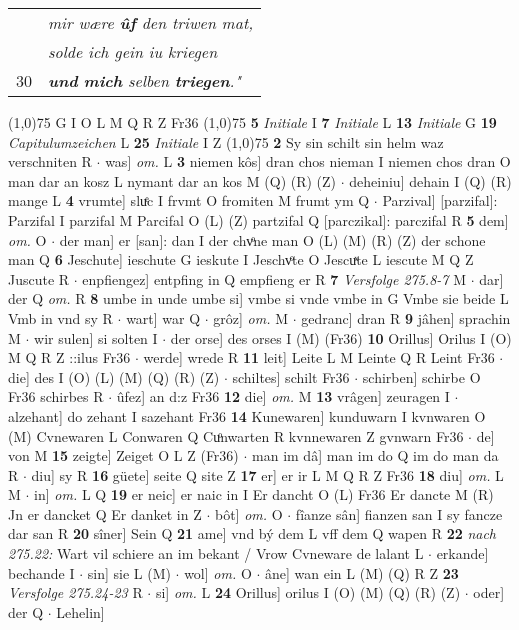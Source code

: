 \documentclass[8pt,a4paper,notitlepage]{article}
\begin{document}
\begin{table}[ht]
\begin{minipage}[t]{0.5\linewidth}
\begin{tabular}{rl}
 & \textit{mir wære \textbf{ûf} den triwen mat,}\\ 
 & \textit{solde ich gein iu kriegen}\\ 
30 & \textit{\textbf{und} \textbf{mich} selben \textbf{triegen}."}\\ 
\end{tabular}
\scriptsize
\line(1,0){75} \newline
G I O L M Q R Z Fr36 \newline
\line(1,0){75} \newline
\textbf{5} \textit{Initiale} I  \textbf{7} \textit{Initiale} L  \textbf{13} \textit{Initiale} G  \textbf{19} \textit{Capitulumzeichen} L  \textbf{25} \textit{Initiale} I Z  \newline
\line(1,0){75} \newline
\textbf{2} Sy sin schilt sin helm waz verschniten R  $\cdot$ was] \textit{om.} L \textbf{3} niemen kôs] dran chos nieman I niemen chos dran O man dar an kosz L nymant dar an kos M (Q) (R) (Z)  $\cdot$ deheiniu] dehain I (Q) (R) mange L \textbf{4} vrumte] sluͤc I frvmt O fromiten M frumt ym Q  $\cdot$ Parzival] [parzifal]: Parzifal I parzifal M Parcifal O (L) (Z) partzifal Q [parczikal]: parczifal R \textbf{5} dem] \textit{om.} O  $\cdot$ der man] er [san]: dan I der chvͦne man O (L) (M) (R) (Z) der schone man Q \textbf{6} Jeschute] ieschute G ieskute I Jeschvͦte O Jescuͯte L iescute M Q Z Juscute R  $\cdot$ enpfiengez] entpfing in Q empfieng er R \textbf{7} \textit{Versfolge 275.8-7} M   $\cdot$ dar] der Q \textit{om.} R \textbf{8} umbe in unde umbe si] vmbe si vnde vmbe in G Vmbe sie beide L Vmb in vnd sy R  $\cdot$ wart] war Q  $\cdot$ grôz] \textit{om.} M  $\cdot$ gedranc] dran R \textbf{9} jâhen] sprachin M  $\cdot$ wir sulen] si solten I  $\cdot$ der orse] des orses I (M) (Fr36) \textbf{10} Orillus] Orilus I (O) M Q R Z ::ilus Fr36  $\cdot$ werde] wrede R \textbf{11} leit] Leite L M Leinte Q R Leint Fr36  $\cdot$ die] des I (O) (L) (M) (Q) (R) (Z)  $\cdot$ schiltes] schilt Fr36  $\cdot$ schirben] schirbe O Fr36 schirbes R  $\cdot$ ûfez] an d:z Fr36 \textbf{12} die] \textit{om.} M \textbf{13} vrâgen] zeuragen I  $\cdot$ alzehant] do zehant I sazehant Fr36 \textbf{14} Kunewaren] kunduwarn I kvnwaren O (M) Cvnewaren L Conwaren Q Cuͦnwarten R kvnnewaren Z gvnwarn Fr36  $\cdot$ de] von M \textbf{15} zeigte] Zeiget O L Z (Fr36)  $\cdot$ man im dâ] man im do Q im do man da R  $\cdot$ diu] sy R \textbf{16} güete] seite Q site Z \textbf{17} er] er ir L M Q R Z Fr36 \textbf{18} diu] \textit{om.} L M  $\cdot$ in] \textit{om.} L Q \textbf{19} er neic] er naic in I Er dancht O (L) Fr36 Er dancte M (R) Jn er dancket Q Er danket in Z  $\cdot$ bôt] \textit{om.} O  $\cdot$ fîanze sân] fianzen san I sy fancze dar san R \textbf{20} sîner] Sein Q \textbf{21} ame] vnd bý dem L vff dem Q wapen R \textbf{22} \textit{nach 275.22:} Wart vil schiere an im bekant / Vrow Cvneware de lalant L   $\cdot$ erkande] bechande I  $\cdot$ sin] sie L (M)  $\cdot$ wol] \textit{om.} O  $\cdot$ âne] wan ein L (M) (Q) R Z \textbf{23} \textit{Versfolge 275.24-23} R   $\cdot$ si] \textit{om.} L \textbf{24} Orillus] orilus I (O) (M) (Q) (R) (Z)  $\cdot$ oder] der Q  $\cdot$ Lehelin] 
\end{minipage}
\end{table}
\end{document}
